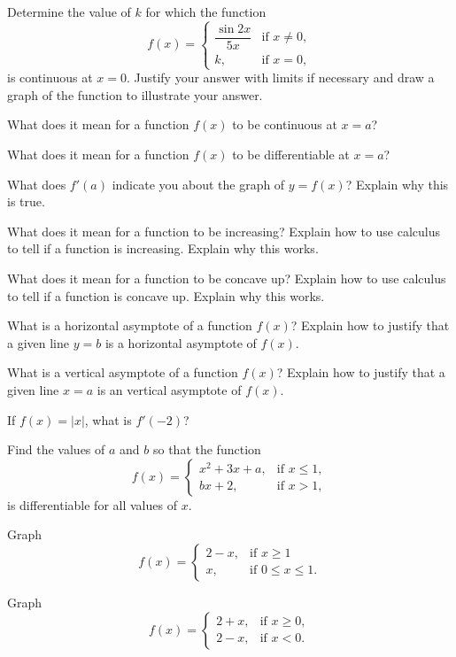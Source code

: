 \begin{multicols}{2}
  \problem Determine the value of $k$ for which the function
  \[
  f(x)=
  \begin{cases}
    \dfrac{\sin 2x}{5x}& \text{if } x\ne 0,\\
    k, & \text{if } x=0,
  \end{cases}
  \]
  is continuous at $x=0$.  Justify your answer with limits if necessary and
  draw a graph of the function to illustrate your answer.


  \problem What does it mean for a function $f(x)$ to be continuous at $x=a$?


  \problem What does it mean for a function $f(x)$ to be differentiable at
  $x=a$?


  \problem What does $f'(a)$ indicate you about the graph of $y=f(x)$?
  Explain why this is true.


  \problem What does it mean for a function to be increasing?  Explain how to
  use calculus to tell if a function is increasing.  Explain why this works.


  \problem What does it mean for a function to be concave up?  Explain how to
  use calculus to tell if a function is concave up. Explain why this works.


  \problem What is a horizontal asymptote of a function $f(x)$?  Explain how
  to justify that a given line $y=b$ is a horizontal asymptote of $f(x)$.


  \problem What is a vertical asymptote of a function $f(x)$?  Explain how to
  justify that a given line $x=a$ is an vertical asymptote of $f(x)$.


  \problem If $f(x)=|x|$, what is $f'(-2)$?


  \problem Find the values of $a$ and $b$ so that the function
  \[
  f(x)=
  \begin{cases}
    x^2+3x+a,& \text{if } x\le 1,\\
    bx+2, & \text{if } x>1,
  \end{cases}
  \]
  is differentiable for all values of $x$.


  \problem Graph
  \[
  f(x)=
  \begin{cases}
    2-x,& \text{if } x\ge 1\\
    x, & \text{if } 0\le x\le 1.
  \end{cases}
  \]


  \problem Graph
  \[
  f(x)=
  \begin{cases}
    2+x, &\text{if } x\ge 0,\\
    2-x, &\text{if } x<0.
  \end{cases}
  \]



\end{multicols}
